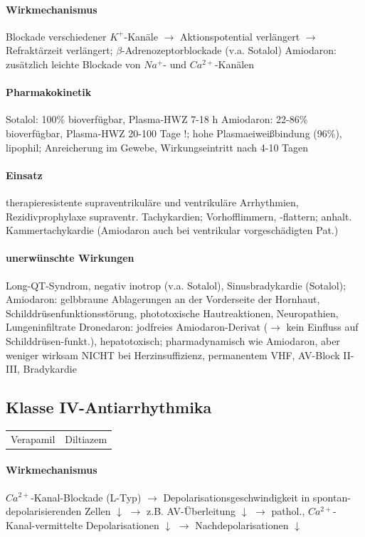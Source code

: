 \documentclass[10pt,a4paper]{report}
\begin{document}
\paragraph{Wirkmechanismus} Blockade verschiedener $K^+$-Kanäle 	$\rightarrow$ Aktionspotential verlängert $\rightarrow$ Refraktärzeit verlängert; $\beta$-Adrenozeptorblockade (v.a. Sotalol)
Amiodaron: zusätzlich leichte Blockade von $Na^+$- und $Ca^{2+}$-Kanälen

\paragraph{Pharmakokinetik} Sotalol: 100\% bioverfügbar, Plasma-HWZ 7-18 h
Amiodaron: 22-86\% bioverfügbar, Plasma-HWZ 20-100 Tage !;
hohe Plasmaeiweißbindung (96\%), lipophil; Anreicherung im Gewebe, Wirkungseintritt nach 4-10 Tagen

\paragraph{Einsatz} therapieresistente supraventrikuläre und ventrikuläre Arrhythmien,
Rezidivprophylaxe supraventr. Tachykardien; Vorhofflimmern, -flattern; anhalt. Kammertachykardie (Amiodaron auch bei ventrikular vorgeschädigten Pat.)

\paragraph{unerwünschte Wirkungen} Long-QT-Syndrom, negativ inotrop (v.a. Sotalol), Sinusbradykardie (Sotalol); Amiodaron: gelbbraune Ablagerungen an der Vorderseite der Hornhaut, Schilddrüsenfunktionsstörung, phototoxische Hautreaktionen, Neuropathien, Lungeninfiltrate
Dronedaron: jodfreies Amiodaron-Derivat ($\rightarrow$ kein Einfluss auf Schilddrüsen-funkt.), hepatotoxisch; pharmadynamisch wie Amiodaron, aber weniger wirksam
NICHT bei Herzinsuffizienz, permanentem VHF, AV-Block \degree II-III, Bradykardie

\subsection{Klasse IV-Antiarrhythmika}

\begin{tabularx}{\textwidth}{XX}
Verapamil&Diltiazem\\
\end{tabularx}

\paragraph{Wirkmechanismus} $Ca^{2+}$-Kanal-Blockade (L-Typ) $\rightarrow$ Depolarisationsgeschwindigkeit in spontan-depolarisierenden Zellen $\downarrow$ $\rightarrow$ z.B. AV-Überleitung $\downarrow$ $\rightarrow$ pathol., $Ca^{2+}$-Kanal-vermittelte Depolarisationen $\downarrow$ $\rightarrow$ Nachdepolarisationen $\downarrow$ 
\end{document}
